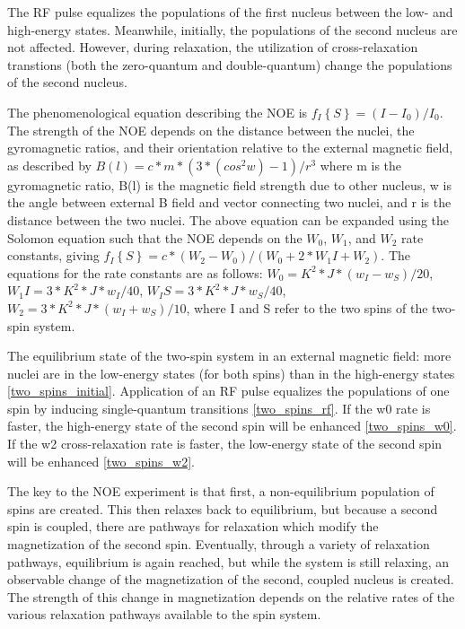 The RF pulse equalizes the populations of the first nucleus between the low-
and high-energy states.  Meanwhile, initially, the populations of the second
nucleus are not affected.  However, during relaxation, the utilization of
cross-relaxation transtions (both the zero-quantum
and double-quantum) change the populations of the second nucleus.

The phenomenological equation describing the NOE is 
$ f_I\left\{S\right\} = (I - I_0) / I_0 $.
The strength of the NOE depends on the distance between the nuclei, 
the gyromagnetic ratios, and their orientation relative to the external 
magnetic field, as described by $B(l) = c * m * (3*(cos^2 w)-1) / r^3$
where 
m    is the gyromagnetic ratio,
B(l) is the magnetic field strength due to other nucleus,
w    is the angle between external B field and vector connecting two nuclei, and
r    is the distance between the two nuclei.
The above equation can be expanded using the Solomon equation such that the
NOE depends on the $ W_0 $, $ W_1 $, and $ W_2 $ rate constants, giving
$ f_I\left\{S\right\} = c * (W_2 - W_0) / (W_0 + 2 * W_1I + W_2) $.
The equations for the rate constants are as follows:
$ W_0 = K^2 * J * (w_I - w_S) / 20 $,
$ W_1I = 3 * K^2 * J * w_I / 40 $,
$ W_IS = 3 * K^2 * J * w_S / 40 $,
$ W_2 = 3 * K^2 * J * (w_I + w_S) / 10 $,
where I and S refer to the two spins of the two-spin system.

The equilibrium state of the two-spin system in an external magnetic field:
more nuclei are in the low-energy states (for both spins) than in the 
high-energy states \ref{two_spins_initial}.
Application of an RF pulse equalizes the populations of one spin by inducing
single-quantum transitions \ref{two_spins_rf}.
If the w0 rate is faster, the high-energy state of the second spin will be
enhanced \ref{two_spins_w0}.
If the w2 cross-relaxation rate is faster, the low-energy state of the second
spin will be enhanced \ref{two_spins_w2}.

The key to the NOE experiment is that first, a non-equilibrium population of
spins are created.  This then relaxes back to equilibrium, but because a 
second spin is coupled, there are pathways for relaxation which modify the
magnetization of the second spin.  Eventually, through a variety of relaxation
pathways, equilibrium is again reached,
but while the system is still relaxing, an observable change of the 
magnetization of the second, coupled nucleus is created.  The strength of
this change in magnetization depends on the relative rates of the various
relaxation pathways available to the spin system.




